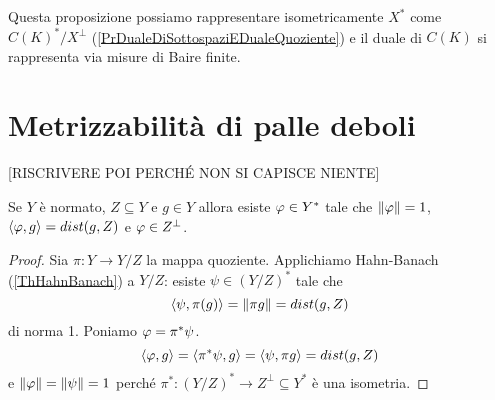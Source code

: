\begin{remark}
Questa proposizione possiamo rappresentare isometricamente $X^\ast$ come $C(K)^\ast/X^\perp$ (\ref{PrDualeDiSottospaziEDualeQuoziente}) e il duale di $C(K)$ si rappresenta via misure di Baire finite.
\end{remark}



\section{Metrizzabilit\`a di palle deboli}

[RISCRIVERE POI PERCH\'E NON SI CAPISCE NIENTE]

\begin{lemma}\label{LmFunzionaleAssumeDistanzaPerFissatoElemento}
Se $Y$ \`e normato, $Z\subseteq Y$ e $g\in Y$ allora esiste $\varphi\in Y^\ast$ tale che $\left\Vert{\varphi}\right\Vert=1$, $\left\langle {\varphi,g}\right\rangle=dist(g,Z)$ e $\varphi\in Z^\perp$.
\end{lemma}
\begin{proof}
	Sia $\pi:Y\to Y/Z$ la mappa quoziente. Applichiamo Hahn-Banach (\ref{ThHahnBanach}) a $Y/Z$: esiste $\psi\in (Y/Z)^\ast$ tale che \[\left\langle {\psi,\pi(g)}\right\rangle=\left\Vert{\pi g}\right\Vert=dist(g,Z)\]
	di norma 1. Poniamo $\varphi=\pi^\ast\psi$.
	\[\left\langle {\varphi,g}\right\rangle=\left\langle {\pi^\ast\psi,g}\right\rangle=\left\langle {\psi,\pi g}\right\rangle=dist(g,Z)\]
	e $\left\Vert{\varphi}\right\Vert=\left\Vert{\psi}\right\Vert=1$ perch\'e $\pi^\ast:(Y/Z)^\ast\to Z^\perp\subseteq Y^\ast$ \`e una isometria.
\end{proof}

